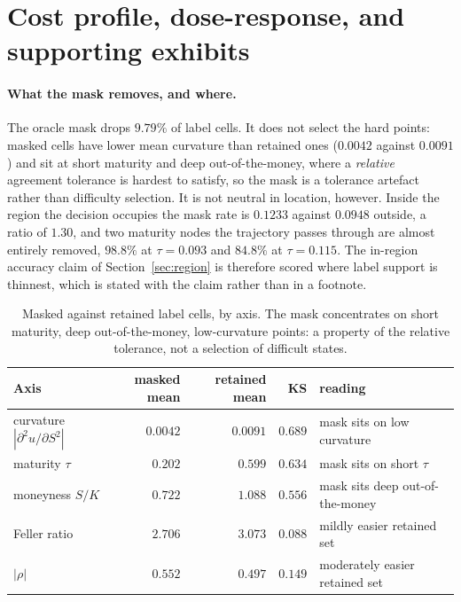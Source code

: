 \documentclass{article}
\begin{document}
\section{Cost profile, dose-response, and supporting exhibits}
\label{app:exhibits}

\paragraph{What the mask removes, and where.} The oracle mask drops $9.79\%$ of
label cells. It does not select the hard points: masked cells have lower mean
curvature than retained ones ($0.0042$ against $0.0091$) and sit at short maturity
and deep out-of-the-money, where a \emph{relative} agreement tolerance is hardest to
satisfy, so the mask is a tolerance artefact rather than difficulty selection.
It is not neutral in location, however. Inside the region the decision occupies the
mask rate is $0.1233$ against $0.0948$ outside, a ratio of $1.30$, and two maturity
nodes the trajectory passes through are almost entirely removed, $98.8\%$ at
$\tau = 0.093$ and $84.8\%$ at $\tau = 0.115$. The in-region accuracy claim of
Section~\ref{sec:region} is therefore scored where label support is thinnest, which
is stated with the claim rather than in a footnote.

\begin{table}[h]
\caption{Masked against retained label cells, by axis. The mask concentrates on
short maturity, deep out-of-the-money, low-curvature points: a property of the
relative tolerance, not a selection of difficult states.}
\label{tab:mask}
\centering\footnotesize\setlength{\tabcolsep}{6pt}
\begin{tabular}{@{}lrrrl@{}}
\toprule
Axis & masked mean & retained mean & KS & reading \\
\midrule
curvature $|\partial^{2}u/\partial S^{2}|$ & $0.0042$ & $0.0091$ & $0.689$ & mask sits on low curvature \\
maturity $\tau$ & $0.202$ & $0.599$ & $0.634$ & mask sits on short $\tau$ \\
moneyness $S/K$ & $0.722$ & $1.088$ & $0.556$ & mask sits deep out-of-the-money \\
Feller ratio & $2.706$ & $3.073$ & $0.088$ & mildly easier retained set \\
$|\rho|$ & $0.552$ & $0.497$ & $0.149$ & moderately easier retained set \\
\bottomrule
\end{tabular}
\end{table}
\end{document}
